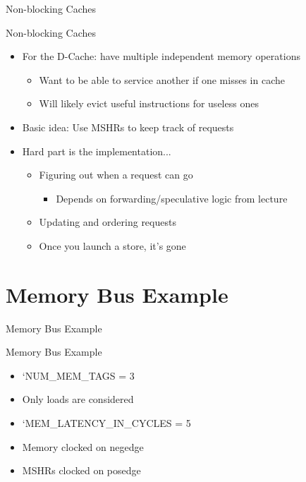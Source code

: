 \documentclass[table,dvipsnames]{beamer}
\begin{document}
\begin{frame}[fragile]{Non-blocking Caches}
	\begin{block}{Non-blocking Caches}
	\begin{itemize}
		\item For the D-Cache: have multiple independent memory operations
		\begin{itemize} \item Want to be able to service another if one misses in cache
				\item Will likely evict useful instructions for useless ones \end{itemize}
		\item Basic idea: Use MSHRs to keep track of requests
		\item Hard part is the implementation...
			\begin{itemize} \item Figuring out when a request can go 
			\begin{itemize} \item Depends on forwarding/speculative logic from lecture \end{itemize}
			\item Updating and ordering requests
			\item Once you launch a store, it's gone
			\end{itemize}
	\end{itemize}
	\end{block}	
\end{frame}


\section{Memory Bus Example}

\begin{frame}[fragile]{Memory Bus Example}
	\begin{block}{Memory Bus Example}
	\begin{itemize}
		\item `NUM\_MEM\_TAGS = 3
		\item Only loads are considered
		\item `MEM\_LATENCY\_IN\_CYCLES = 5
		\item Memory clocked on negedge
		\item MSHRs clocked on posedge
	\end{itemize}

	\end{block}	
\end{frame}
\end{document}
